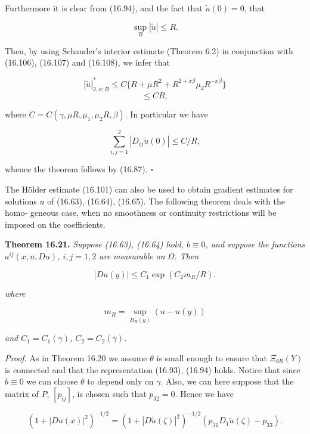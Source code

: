 Furthermore it is clear from (16.94), and the fact that $\tilde u(0)=0$, that

\begin{equation}\tag{16.108}
\sup_B |\tilde u|\leq R.
\end{equation}

Then, by using Schauder's interior estimate (Theorem 6.2) in conjunction with
(16.106), (16.107) and (16.108), we infer that

\[
|\tilde u|_{2,x;B}^*\leq C\{R+\mu R^2+R^{2+x\beta}\mu_2R^{-x\beta}\}
\]
\[
\leq CR,
\]

where $C=C(\gamma,\mu R,\mu_1,\mu_2R,\beta)$. In particular we have

\[
\sum_{i,j=1}^2 |D_{ij}\tilde u(0)|\leq C/R,
\]

whence the theorem follows by (16.87). $\square$

The H\"older estimate (16.101) can also be used to obtain gradient estimates for
solutions $u$ of (16.63), (16.64), (16.65). The following theorem deals with the homo-
geneous case, when no smoothness or continuity restrictions will be imposed on
the coefficients.



\pagestyle{empty}


\setcounter{section}{16}

\textbf{Theorem 16.21.} \emph{Suppose (16.63), (16.64) hold, $b \equiv 0$, and suppose the functions
$a^{ij}(x,u,Du)$, $i,j=1,2$ are measurable on $\Omega$. Then}

\begin{equation}
|Du(y)| \le C_1 \exp(C_2 m_R / R).
\tag{16.109}
\end{equation}

\emph{where}

\[
m_R = \sup_{B_R(y)} (u-u(y))
\]

\emph{and $C_1 = C_1(\gamma)$, $C_2 = C_2(\gamma)$.}

\emph{Proof.} As in Theorem 16.20 we assume $\theta$ is small enough to ensure that
$\Xi_{\theta R}(Y)$ is connected and that the representation (16.93), (16.94) holds.
Notice that since $b \equiv 0$ we can choose $\theta$ to depend only on $\gamma$.
Also, we can here suppose that the matrix of $P$, $[p_{ij}]$, is chosen such that
$p_{32}=0$. Hence we have

\begin{equation}
(1+|Du(x)|^2)^{-1/2} = (1+|D\tilde u(\zeta)|^2)^{-1/2}(p_{31}D_1\tilde u(\zeta)-p_{33}).
\tag{16.110}
\end{equation}


